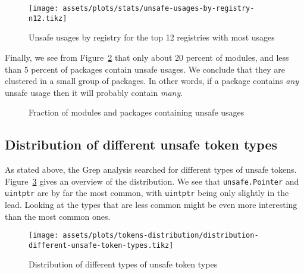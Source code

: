 \begin{figure}[ht]
    \centering
    {\scriptsize \texttt{[image: assets/plots/stats/unsafe-usages-by-registry-n12.tikz]}}
    \caption{Unsafe usages by registry for the top 12 registries with most usages}
    \label{fig:unsafe-usages-by-registry}
\end{figure}

Finally, we see from Figure~\ref{fig:fraction-of-unsafe-modules-and-packages} that only about 20 percent of modules, and
less than 5 percent of packages contain unsafe usages.
We conclude that they are clustered in a small group of packages.
In other words, if a package contains \textit{any} unsafe usage then it will probably contain \textit{many}.

\begin{figure}[ht]
    \centering
    \caption{Fraction of modules and packages containing unsafe usages}
    \label{fig:fraction-of-unsafe-modules-and-packages}
\end{figure}



\subsection{Distribution of different unsafe token types}\label{subsec:results-tokens-distribution}

As stated above, the Grep analysis searched for different types of unsafe tokens.
Figure~\ref{fig:unsafe-tokens-distribution} gives an overview of the distribution.
We see that \texttt{unsafe.Pointer} and \texttt{uintptr} are by far the most common, with \texttt{uintptr} being only
slightly in the lead.
Looking at the types that are less common might be even more interesting than the most common ones.

\begin{figure}[ht]
    \centering
    {\scriptsize \texttt{[image: assets/plots/tokens-distribution/distribution-different-unsafe-token-types.tikz]}}
    \caption{Distribution of different types of unsafe token types}
    \label{fig:unsafe-tokens-distribution}
\end{figure}


